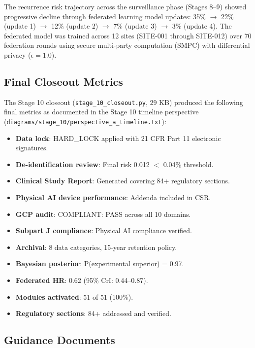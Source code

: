 The recurrence risk trajectory across the surveillance phase (Stages 8--9) showed progressive decline through federated learning model updates: 35\% $\rightarrow$ 22\% (update 1) $\rightarrow$ 12\% (update 2) $\rightarrow$ 7\% (update 3) $\rightarrow$ 3\% (update 4). The federated model was trained across 12 sites (SITE-001 through SITE-012) over 70 federation rounds using secure multi-party computation (SMPC) with differential privacy ($\epsilon = 1.0$).

\newpage

\subsection{Final Closeout Metrics}

The Stage 10 closeout (\texttt{stage\_10\_closeout.py}, 29 KB) produced the following final metrics as documented in the Stage 10 timeline perspective (\texttt{diagrams/stage\_10/perspective\_a\_timeline.txt}):

\begin{itemize}[leftmargin=*]
\item \textbf{Data lock}: HARD\_LOCK applied with 21 CFR Part 11 electronic signatures.
\item \textbf{De-identification review}: Final risk 0.012 $<$ 0.04\% threshold.
\item \textbf{Clinical Study Report}: Generated covering 84+ regulatory sections.
\item \textbf{Physical AI device performance}: Addenda included in CSR.
\item \textbf{GCP audit}: COMPLIANT: PASS across all 10 domains.
\item \textbf{Subpart J compliance}: Physical AI compliance verified.
\item \textbf{Archival}: 8 data categories, 15-year retention policy.
\item \textbf{Bayesian posterior}: P(experimental superior) = 0.97.
\item \textbf{Federated HR}: 0.62 (95\% CrI: 0.44--0.87).
\item \textbf{Modules activated}: 51 of 51 (100\%).
\item \textbf{Regulatory sections}: 84+ addressed and verified.
\end{itemize}

\subsection{Guidance Documents}

